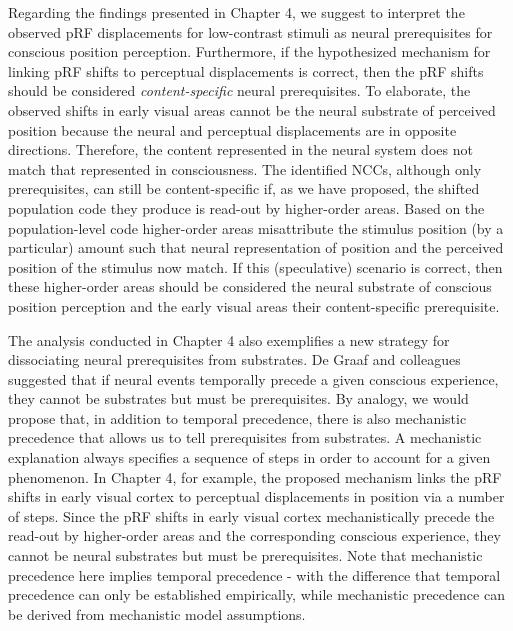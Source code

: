Regarding the findings presented in Chapter 4, we suggest to interpret the observed pRF displacements for low-contrast stimuli as neural prerequisites for conscious position perception. Furthermore, if the hypothesized mechanism for linking pRF shifts to perceptual displacements is correct, then the pRF shifts should be considered \textit{content-specific} neural prerequisites. To elaborate, the observed shifts in early visual areas cannot be the neural substrate of perceived position because the neural and perceptual displacements are in opposite directions. Therefore, the content represented in the neural system does not match that represented in consciousness. The identified NCCs, although only prerequisites, can still be content-specific if, as we have proposed, the shifted population code they produce is read-out by higher-order areas. Based on the population-level code higher-order areas misattribute the stimulus position (by a particular) amount such that neural representation of position and the perceived position of the stimulus now match. If this (speculative) scenario is correct, then these higher-order areas should be considered the neural substrate of conscious position perception and the early visual areas their content-specific prerequisite.

The analysis conducted in Chapter 4 also exemplifies a new strategy for dissociating neural prerequisites from substrates. De Graaf and colleagues \parencite*{DeGraaf2012} suggested that if neural events temporally precede a given conscious experience, they cannot be substrates but must be prerequisites. By analogy, we would propose that, in addition to temporal precedence, there is also mechanistic precedence that allows us to tell prerequisites from substrates. A mechanistic explanation always specifies a sequence of steps in order to account for a given phenomenon. In Chapter 4, for example, the proposed mechanism links the pRF shifts in early visual cortex to perceptual displacements in position via a number of steps. Since the pRF shifts in early visual cortex mechanistically precede the read-out by higher-order areas and the corresponding conscious experience, they cannot be neural substrates but must be prerequisites. Note that mechanistic precedence here implies temporal precedence - with the difference that temporal precedence can only be established empirically, while mechanistic precedence can be derived from mechanistic model assumptions.


